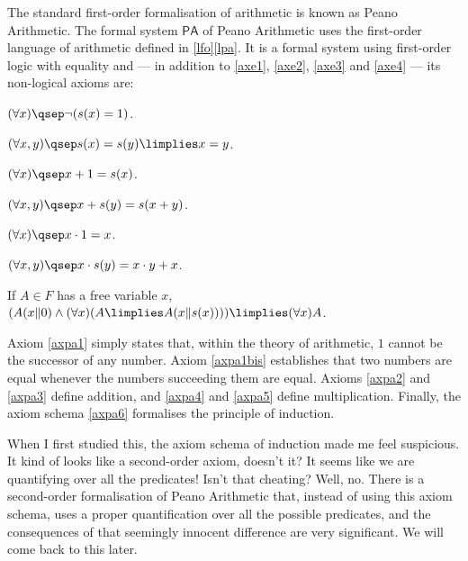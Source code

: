 \begin{example}
\begin{parlist}
\item \label{fspa} The standard first-order formalisation of arithmetic is known as Peano Arithmetic. The formal system $\mathsf{PA}$ of Peano Arithmetic uses the first-order language of arithmetic defined in \ref{lfo}\ref{lpa}. It is a formal system using first-order logic with equality and --- in addition to \ref{axe1}, \ref{axe2}, \ref{axe3} and \ref{axe4} --- its non-logical axioms are:
\begin{axioms}[PA]
\item \label{axpa1} $(\forall x)\qsep\lnot(s(x) = 1)$.
\item \label{axpa1bis} $(\forall x,y)\qsep s(x) = s(y) \limplies x = y$.
\item \label{axpa2} $(\forall x)\qsep x + 1 = s(x)$.
\item \label{axpa3} $(\forall x,y)\qsep x + s(y) = s(x+y)$.
\item \label{axpa4} $(\forall x)\qsep x \cdot 1 = x$.
\item \label{axpa5} $(\forall x,y)\qsep x \cdot s(y) = x\cdot y + x$.
\item \label{axpa6} If $A\in F$ has a free variable $x$, $(A(x\Vert0) \land (\forall x) (A \limplies A(x\Vert s(x)))) \limplies (\forall x) A$. 
\end{axioms}
Axiom \ref{axpa1} simply states that, within the theory of arithmetic, $1$ cannot be the successor of any number.
Axiom \ref{axpa1bis} establishes that two numbers are equal whenever the numbers succeeding them are equal.
Axioms \ref{axpa2} and \ref{axpa3} define addition, and \ref{axpa4} and \ref{axpa5} define multiplication. Finally, the axiom schema \ref{axpa6} formalises the principle of induction.

When I first studied this, the axiom schema of induction made me feel suspicious. It kind of looks like a second-order axiom, doesn't it? It seems like we are quantifying over all the predicates! Isn't that cheating? Well, no. There is a second-order formalisation of Peano Arithmetic that, instead of using this axiom schema, uses a proper quantification over all the possible predicates, and the consequences of that seemingly innocent difference are very significant. 
We will come back to this later.
\end{parlist}
\end{example}

